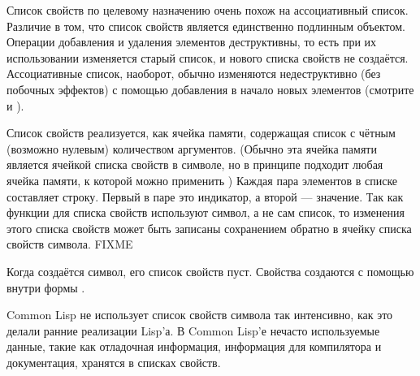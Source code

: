 Список свойств по целевому назначению очень похож на ассоциативный
список. Различие в том, что список свойств является единственно подлинным
объектом. Операции добавления и удаления элементов деструктивны, то есть при их
использовании изменяется старый список, и нового списка свойств не создаётся.
Ассоциативные список, наоборот, обычно изменяются недеструктивно (без побочных
эффектов) с помощью добавления в начало новых элементов (смотрите  и
).

Список свойств реализуется, как ячейка памяти, содержащая список с чётным
(возможно нулевым) количеством аргументов.
(Обычно эта ячейка памяти является ячейкой списка свойств в символе, но в
принципе подходит любая ячейка памяти, к которой можно применить )
Каждая пара элементов в списке составляет строку.
Первый в паре это индикатор, а второй --- значение. Так как функции для списка
свойств используют символ, а не сам список, то изменения этого списка свойств
может быть записаны сохранением обратно в ячейку списка свойств символа. FIXME

Когда создаётся символ, его список свойств пуст. Свойства создаются с помощью
 внутри формы .

Common Lisp не использует список свойств символа так интенсивно, как это делали
ранние реализации Lisp'а. В Common Lisp'е нечасто используемые данные, такие как
отладочная информация, информация для компилятора и документация, хранятся в списках
свойств.

